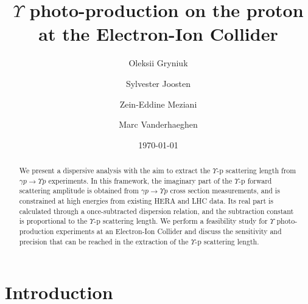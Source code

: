\documentclass[prd,amsmath,%
twocolumn,floatfix,amssymb, preprintnumbers, linenumbers,nofootinbib, superscriptaddress]{revtex4}
\begin{document}
\title{$\Upsilon$ photo-production on the proton at the Electron-Ion Collider}
\author{Oleksii Gryniuk}
\author{Sylvester Joosten}
\author{Zein-Eddine Meziani}
\author{Marc Vanderhaeghen}
\noaffiliation
\date{\today}

\begin{abstract}

We present a dispersive analysis with the aim to extract the $\Upsilon$-p scattering length from $\gamma p \to \Upsilon p$ experiments. In this framework, the imaginary part of the $\Upsilon$-p forward scattering amplitude is obtained from $\gamma p \to \Upsilon p$ cross section measurements, and is constrained at high energies from existing HERA and LHC data. Its real part is calculated through a once-subtracted dispersion relation, and    
the subtraction constant is proportional to the $\Upsilon$-p scattering length. We perform a feasibility study for $\Upsilon$ photo-production experiments at an Electron-Ion Collider and discuss the sensitivity and precision that can be reached in the extraction of the $\Upsilon$-p scattering length. 

\end{abstract}

\maketitle



\section{Introduction}
\end{document}
